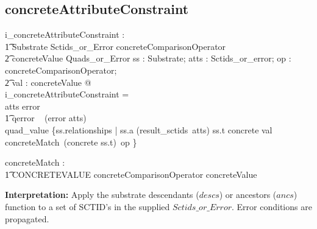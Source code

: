 \documentclass{article}
\begin{document}
\subsection{concreteAttributeConstraint}


\begin{gendef}
  i\_concreteAttributeConstraint : \\
\t1 Substrate \fun Sctids\_or\_Error \fun concreteComparisonOperator \fun\\
\t2 concreteValue \fun Quads\_or\_Error
\where
   \forall ss : Substrate; atts : Sctids\_or\_error; op : concreteComparisonOperator; \\
\t2 val : concreteValue @ \\
i\_concreteAttributeConstraint = \\
\IF atts \in \ran error \\
\t1 \THEN qerror ~ (error \inv atts) \\
   \ELSE quad\_value \{ss.relationships | ss.a \in (result\_sctids~atts) \land ss.t \in \ran concrete \land val \in concreteMatch~(concrete \inv ss.t)~op \}
\end{gendef}

\begin{gendef}
   concreteMatch : \\
\t1 CONCRETEVALUE \fun concreteComparisonOperator \fun concreteValue
\end{gendef}

\noindent
\textbf{Interpretation:}  Apply the substrate descendants ($descs$) or ancestors ($ancs$) function to a set of SCTID's in the supplied
$Sctids\_or\_Error$.  Error conditions are propagated.
\end{document}
